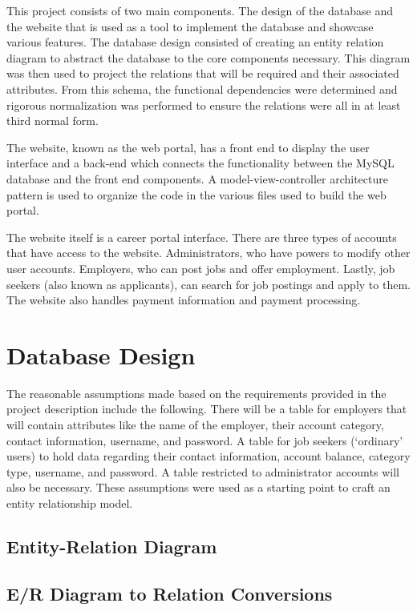 \documentclass[11pt]{article}
\begin{document}
This project consists of two main components. The design of the database and the website that is used as a tool to implement the database and showcase various features. The database design consisted of creating an entity relation diagram to abstract the database to the core components necessary. This diagram was then used to project the relations that will be required and their associated attributes. From this schema, the functional dependencies were determined and rigorous normalization was performed to ensure the relations were all in at least third normal form. \par
The website, known as the web portal, has a front end to display the user interface and a back-end which connects the functionality between the MySQL database and the front end components. A model-view-controller architecture pattern is used to organize the code in the various files used to build the web portal. \par
The website itself is a career portal interface. There are three types of accounts that have access to the website. Administrators, who have powers to modify other user accounts. Employers, who can post jobs and offer employment. Lastly, job seekers (also known as applicants), can search for job postings and apply to them. The website also handles payment information and payment processing.

\section{Database Design}

The reasonable assumptions made based on the requirements provided in the project description include the following. There will be a table for employers that will contain attributes like the name of the employer, their account category, contact information, username, and password. A table for job seekers (`ordinary' users) to hold data regarding their contact information, account balance, category type, username, and password. A table restricted to administrator accounts will also be necessary. These assumptions were used as a starting point to craft an entity relationship model.

\subsection{Entity-Relation Diagram}

\subsection{E/R Diagram to Relation Conversions}
\end{document}
